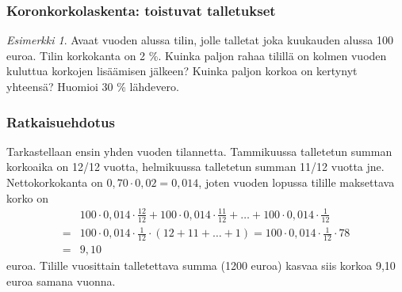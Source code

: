 \documentclass{article}\usepackage[]{graphicx}\usepackage[]{color}
\theoremstyle{remark}
\newtheorem{esim}{Esimerkki}
\newtheorem{ratkaisu}{Ratkaisuehdotus}
\begin{document}

\begin{frame}
    \frametitle{Koronkorkolaskenta: toistuvat talletukset}
    \pause
    \begin{esim}
        Avaat vuoden alussa tilin, jolle talletat joka kuukauden alussa 100 euroa.
        Tilin korkokanta on 2 \%. Kuinka paljon rahaa tilillä on kolmen vuoden kuluttua korkojen lisäämisen jälkeen?
        Kuinka paljon korkoa on kertynyt yhteensä? Huomioi 30 \% lähdevero.
    \end{esim}
\end{frame}

\begin{frame}
    \frametitle{Ratkaisuehdotus}
    \pause
        Tarkastellaan ensin yhden vuoden tilannetta. 
        \pause
        Tammikuussa talletetun summan korkoaika on 12/12 vuotta, helmikuussa
        talletetun summan 11/12 vuotta jne. 
        \pause Nettokorkokanta on \(0,70\cdot 0,02 = 0,014\),
        joten vuoden lopussa tilille maksettava korko on 
        \pause
        \begin{align*}
             &100\cdot0,014\cdot\frac{12}{12} + 100\cdot0,014\cdot\frac{11}{12} + \ldots + 100\cdot0,014\cdot\frac{1}{12}\\
            =&100\cdot0,014\cdot\frac{1}{12}\cdot(12+11+\ldots+1) = 100\cdot0,014\cdot\frac{1}{12}\cdot78\\
            =&9,10
        \end{align*}
        euroa. 
        \pause Tilille vuosittain talletettava summa (1200 euroa) kasvaa siis korkoa 9,10 euroa samana vuonna.
\end{frame}
\end{document}
